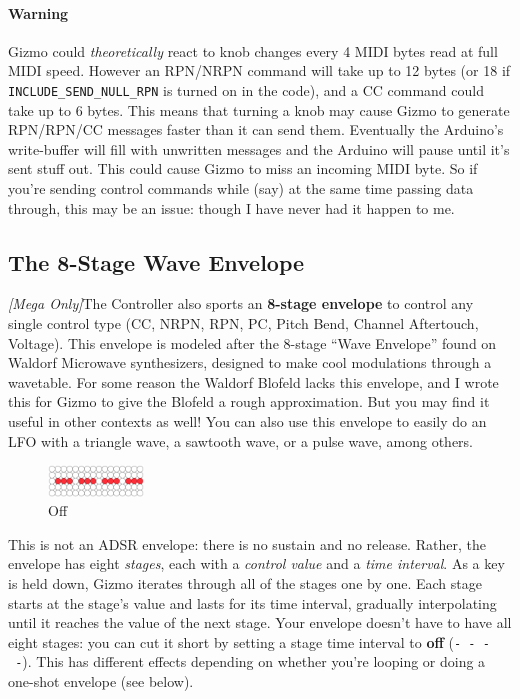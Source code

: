 \documentclass{article}
\begin{document}
\paragraph{Warning} Gizmo could {\it theoretically} react to knob changes every 4 MIDI bytes read at full MIDI speed.  However an RPN/NRPN command will take up to 12 bytes (or 18 if \texttt{INCLUDE\_SEND\_NULL\_RPN} is turned on in the code), and a CC command could take up to 6 bytes.  This means that turning a knob may cause Gizmo to generate RPN/RPN/CC messages faster than it can send them.  Eventually the Arduino's write-buffer will fill with unwritten messages and the Arduino will pause until it's sent stuff out.  This could cause Gizmo to miss an incoming MIDI byte.  So if you're sending control commands while (say) at the same time passing data through, this may be an issue: though I have never had it happen to me.

\subsection{The 8-Stage Wave Envelope}
\label{waveenvelope}

\textit{[Mega Only]}\qquad The Controller also sports an {\bf 8-stage envelope} to control any single control type (CC, NRPN, RPN, PC, Pitch Bend, Channel Aftertouch, Voltage).  This envelope is modeled after the 8-stage ``Wave Envelope'' found on Waldorf Microwave synthesizers, designed to make cool modulations through a wavetable.  For some reason the Waldorf Blofeld lacks this envelope, and I wrote this for Gizmo to give the Blofeld a rough approximation.  But you may find it useful in other contexts as well!  You can also use this envelope to easily do an LFO with a triangle wave, a sawtooth wave, or a pulse wave, among others.

\begin{figure}
\includegraphics[width=1in]{none.pdf}
\vspace{-2em}\caption{\small Off}\vspace{-1em}
\end{figure}

 This is not an ADSR envelope: there is no sustain and no release.  Rather, the envelope has eight {\it stages}, each with a {\it control value} and a {\it time interval}.  As a key is held down, Gizmo iterates through all of the stages one by one.  Each stage starts at the stage's value and lasts for its time interval, gradually interpolating until it reaches the value of the next stage.  Your envelope doesn't have to have all eight stages: you can cut it short by setting a stage time interval to {\bf off} (\texttt{-~-~-~-}).  This has different effects depending on whether you're looping or doing a one-shot envelope (see below).
\end{document}
